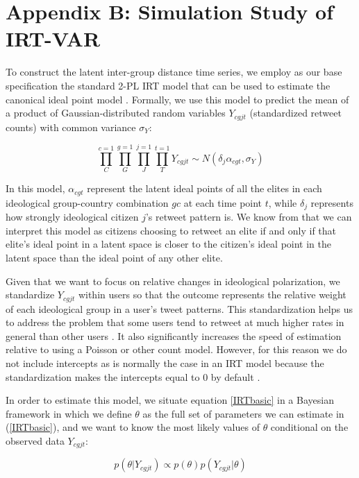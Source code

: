 \documentclass[12pt]{article}
\begin{document}
\section*{Appendix B: Simulation Study of IRT-VAR}


To construct the latent inter-group distance time series, we employ as our base specification the standard 2-PL IRT model that can be used to estimate the canonical ideal point model  \parencite{jackman2004}. Formally, we use this model to predict the mean of a product of Gaussian-distributed random variables $Y_{cgjt}$ (standardized retweet counts) with common variance $\sigma_Y$:

\begin{equation}\label{IRTbasic}
\prod^{c=1}_C \prod^{g=1}_G \prod^{j=1}_J \prod^{t=1}_T Y_{cgjt} \sim N( \delta_j  \alpha_{cgt},\sigma_{Y})
\end{equation}

In this model, $\alpha_{cgt}$ represent the latent ideal points of all the elites in each ideological group-country combination $gc$ at each time point $t$, while $\delta_j$ represents how strongly ideological citizen $j$'s retweet pattern is. We know from \textcite{jackman2004} that we can interpret this model as citizens choosing to retweet an elite if and only if that elite's ideal point in a latent space is closer to the citizen's ideal point in the latent space than the ideal point of any other elite. 

Given that we want to focus on relative changes in ideological polarization, we standardize $Y_{cgjt}$ within users so that the outcome represents the relative weight of each ideological group in a user's tweet patterns. This standardization helps us to address the problem that some users tend to retweet at much higher rates in general than other users \parencite{barbera2015}. It also significantly increases the speed of estimation relative to using a Poisson or other count model. However, for this reason we do not include intercepts as is normally the case in an IRT model because the standardization makes the intercepts equal to 0 by default \parencite{kropko2013}.

In order to estimate this model, we situate equation \ref{IRTbasic} in a Bayesian framework in which we define $\theta$ as the full set of parameters we can estimate in (\ref{IRTbasic}), and we want to know the most likely values of $\theta$ conditional on the observed data $Y_{cgjt}$:

\begin{equation}
p(\theta|Y_{cgjt}) \propto p(\theta)p(Y_{cgjt}|\theta)
\end{equation}
\end{document}
